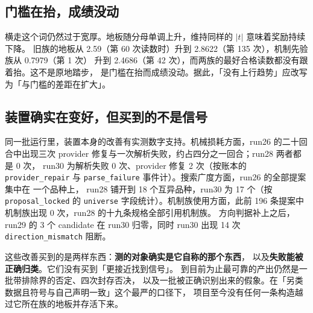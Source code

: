 \subsection{门槛在抬，成绩没动}
横走这个词仍然过于宽厚。地板随分母单调上升，维持同样的 $|t|$ 意味着奖励持续下降。
旧族的地板从 2.59（第 60 次读数时）升到 2.8622（第 135 次），机制先验族从 0.7979（第 1 次）
升到 2.4686（第 42 次），而两族的最好合格读数都没有跟着抬。这不是原地踏步，
是门槛在抬而成绩没动。据此，「没有上行趋势」应改写为「与门槛的差距在扩大」。

\subsection{装置确实在变好，但买到的不是信号}
同一批运行里，装置本身的改善有实测数字支持。机械损耗方面，run26 的二十回合中出现三次
provider 修复与一次解析失败，约占四分之一回合；run28 两者都是 0 次，
run30 为解析失败 0 次、provider 修复 2 次（按账本的 \texttt{provider\_repair} 与
\texttt{parse\_failure} 事件计）。搜索广度方面，run26 的全部提案集中在  一个品种上，
run28 铺开到 18 个互异品种，run30 为 17 个（按 \texttt{proposal\_locked} 的 \texttt{universe}
字段统计）。机制族使用方面，此前 196 条提案中机制族出现 0 次，run28 的十九条规格全部引用机制族。
方向判据补上之后，run29 的 3 个 candidate 在 run30 归零，同时 run30 出现 14 次
\texttt{direction\_mismatch} 阻断。

这些改善买到的是两样东西：\textbf{测的对象确实是它自称的那个东西}，
以及\textbf{失败能被正确归类}。它们没有买到「更接近找到信号」。
到目前为止最可靠的产出仍然是一批带排除界的否定、四次封存否决，
以及一批被正确识别出来的假象。在「另类数据且符号与自己声明一致」这个最严的口径下，
项目至今没有任何一条构造越过它所在族的地板并存活下来。
